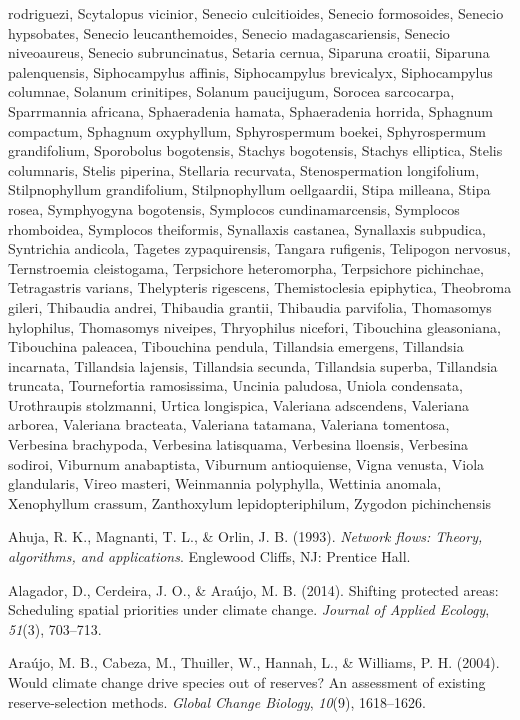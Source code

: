 \documentclass[]{article}
\begin{document}
rodriguezi, Scytalopus vicinior, Senecio culcitioides, Senecio formosoides, Senecio hypsobates, Senecio leucanthemoides, Senecio madagascariensis, Senecio niveoaureus, Senecio subruncinatus, Setaria cernua, Siparuna croatii, Siparuna palenquensis, Siphocampylus affinis, Siphocampylus brevicalyx, Siphocampylus columnae, Solanum crinitipes, Solanum paucijugum, Sorocea sarcocarpa, Sparrmannia africana, Sphaeradenia hamata, Sphaeradenia horrida, Sphagnum compactum, Sphagnum oxyphyllum, Sphyrospermum boekei, Sphyrospermum grandifolium, Sporobolus bogotensis, Stachys bogotensis, Stachys elliptica, Stelis columnaris, Stelis piperina, Stellaria recurvata, Stenospermation longifolium, Stilpnophyllum grandifolium, Stilpnophyllum oellgaardii, Stipa milleana, Stipa rosea, Symphyogyna bogotensis, Symplocos cundinamarcensis, Symplocos rhomboidea, Symplocos theiformis, Synallaxis castanea, Synallaxis subpudica, Syntrichia andicola, Tagetes zypaquirensis, Tangara rufigenis, Telipogon nervosus, Ternstroemia cleistogama, Terpsichore heteromorpha, Terpsichore pichinchae, Tetragastris varians, Thelypteris rigescens, Themistoclesia epiphytica, Theobroma gileri, Thibaudia andrei, Thibaudia grantii, Thibaudia parvifolia, Thomasomys hylophilus, Thomasomys niveipes, Thryophilus nicefori, Tibouchina gleasoniana, Tibouchina paleacea, Tibouchina pendula, Tillandsia emergens, Tillandsia incarnata, Tillandsia lajensis, Tillandsia secunda, Tillandsia superba, Tillandsia truncata, Tournefortia ramosissima, Uncinia paludosa, Uniola condensata, Urothraupis stolzmanni, Urtica longispica, Valeriana adscendens, Valeriana arborea, Valeriana bracteata, Valeriana tatamana, Valeriana tomentosa, Verbesina brachypoda, Verbesina latisquama, Verbesina lloensis, Verbesina sodiroi, Viburnum anabaptista, Viburnum antioquiense, Vigna venusta, Viola glandularis, Vireo masteri, Weinmannia polyphylla, Wettinia anomala, Xenophyllum crassum, Zanthoxylum lepidopteriphilum, Zygodon pichinchensis

\hypertarget{refs}{}
\leavevmode\hypertarget{ref-Ahuja93}{}%
Ahuja, R. K., Magnanti, T. L., \& Orlin, J. B. (1993). \emph{Network flows: Theory, algorithms, and applications}. Englewood Cliffs, NJ: Prentice Hall.

\leavevmode\hypertarget{ref-alagador2014shifting}{}%
Alagador, D., Cerdeira, J. O., \& Araújo, M. B. (2014). Shifting protected areas: Scheduling spatial priorities under climate change. \emph{Journal of Applied Ecology}, \emph{51}(3), 703--713.

\leavevmode\hypertarget{ref-araujo2004would}{}%
Araújo, M. B., Cabeza, M., Thuiller, W., Hannah, L., \& Williams, P. H. (2004). Would climate change drive species out of reserves? An assessment of existing reserve-selection methods. \emph{Global Change Biology}, \emph{10}(9), 1618--1626.
\end{document}
